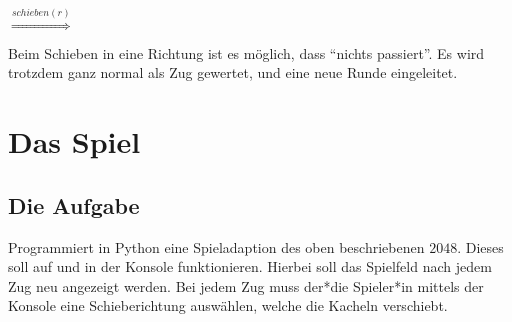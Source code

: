\documentclass[ngerman,accentcolor=3c,colorbacktitle,12pt,T1]{tudaexercise}
\begin{document}
\begin{center}
    $\stackrel{schieben(r)}{\Longrightarrow}$
\end{center}

Beim Schieben in eine Richtung ist es möglich, dass \enquote{nichts passiert}.
Es wird trotzdem ganz normal als Zug gewertet, und eine neue Runde eingeleitet.


\section*{Das Spiel}
\subsection*{Die Aufgabe}
Programmiert in Python eine Spieladaption des oben beschriebenen $2048$.
Dieses soll auf und in der Konsole funktionieren.
Hierbei soll das Spielfeld nach jedem Zug neu angezeigt werden.
Bei jedem Zug muss der*die Spieler*in mittels der Konsole eine Schieberichtung auswählen, welche die Kacheln verschiebt.
\end{document}
